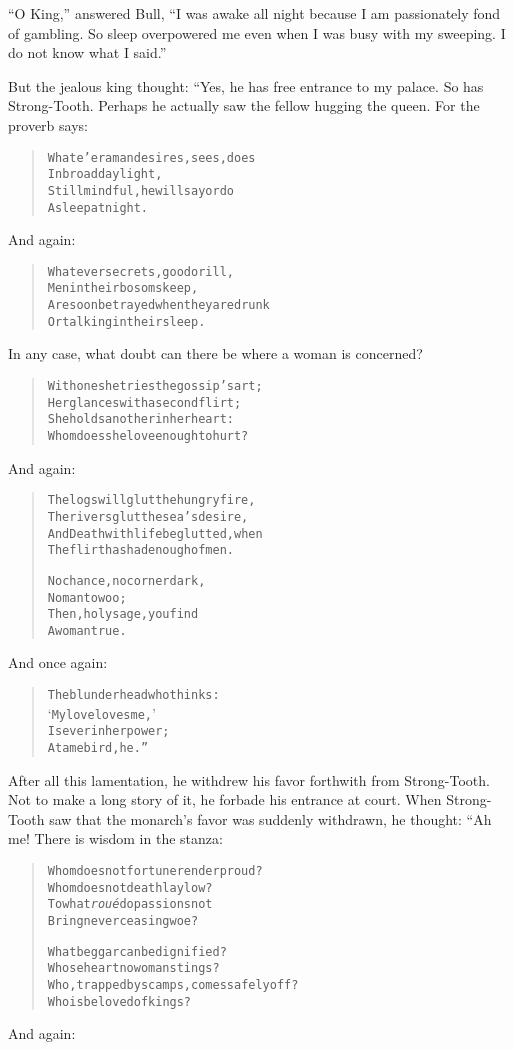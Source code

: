 \documentclass[article, twoside, 14pt]{memoir}
\renewenvironment{verbatim}{%
\begin{quote}%
\vskip -10pt%
\begin{alltt}\normalfont\large}{\end{alltt}%
\end{quote}%
\vskip -10pt
} %
\begin{document}
``O King,'' answered Bull,
``I was awake all night because I am passionately fond of gambling. So sleep overpowered me even when I was busy with my sweeping. I do not know what I said.''

But the jealous king thought: “Yes, he has free entrance to my
palace. So has Strong-Tooth. Perhaps he actually saw the fellow
hugging the queen. For the proverb says:

\begin{verbatim}
Whate'er a man desires, sees, does
    In broad daylight,
Still mindful, he will say or do
    Asleep at night.
\end{verbatim}
And again:

\begin{verbatim}
Whatever secrets, good or ill,
Men in their bosoms keep,
Are soon betrayed when they are drunk
Or talking in their sleep.
\end{verbatim}
In any case, what doubt can there be where a woman is concerned?

\begin{verbatim}
With one she tries the gossip's art;
    Her glances with a second flirt;
She holds another in her heart:
    Whom does she love enough to hurt?
\end{verbatim}
And again:

\begin{verbatim}
The logs will glut the hungry fire,
The rivers glut the sea's desire,
And Death with life be glutted, when
The flirt has had enough of men.

No chance, no corner dark,
    No man to woo;
Then, holy sage, you find
    A woman true.
\end{verbatim}
And once again:

\begin{verbatim}
The blunderhead who thinks:
    ‘My love loves me,’
Is ever in her power;
    A tame bird, he.”
\end{verbatim}
After all this lamentation, he withdrew his favor forthwith from
Strong-Tooth. Not to make a long story of it, he forbade his
entrance at court. When Strong-Tooth saw that the monarch's favor
was suddenly withdrawn, he thought: “Ah me! There is wisdom in the
stanza:

\begin{verbatim}
Whom does not fortune render proud?
    Whom does not death lay low?
To what \emph{roué} do passions not
    Bring never ceasing woe?

What beggar can be dignified?
    Whose heart no woman stings?
Who, trapped by scamps, comes safely off?
    Who is beloved of kings?
\end{verbatim}
And again:
\end{document}
